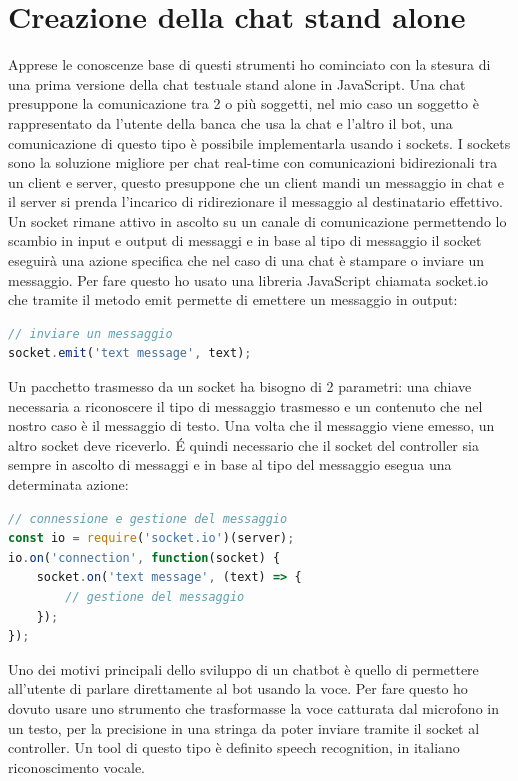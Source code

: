 \section{Creazione della chat stand alone}
Apprese le conoscenze base di questi strumenti ho cominciato con la stesura di una prima versione della chat testuale stand alone in JavaScript. Una chat presuppone la comunicazione tra 2 o più soggetti, nel mio caso un soggetto è rappresentato da l'utente della banca che usa la chat e l'altro il bot, una comunicazione di questo tipo è possibile implementarla usando i sockets.
I sockets sono la soluzione migliore per chat real-time con comunicazioni bidirezionali tra un client e server, questo presuppone che un client mandi un messaggio in chat e il server si prenda l'incarico di ridirezionare il messaggio al destinatario effettivo. Un socket rimane attivo in ascolto su un canale di comunicazione permettendo lo scambio in input e output di messaggi e in base al tipo di messaggio il socket eseguirà una azione specifica che nel caso di una chat è stampare o inviare un messaggio. Per fare questo ho usato una libreria JavaScript chiamata socket.io  che tramite il metodo emit permette di emettere un messaggio in output:
\begin{lstlisting}[language=JavaScript]
// inviare un messaggio
socket.emit('text message', text);
\end{lstlisting}

Un pacchetto trasmesso da un socket ha bisogno di 2 parametri: una chiave necessaria a riconoscere il tipo di messaggio trasmesso e un contenuto che nel nostro caso è il messaggio di testo.
Una volta che il messaggio viene emesso, un altro socket deve riceverlo. \'{E} quindi necessario che il socket del controller sia sempre in ascolto di messaggi e in base al tipo del messaggio esegua una determinata azione:
\begin{lstlisting}[language=JavaScript]
// connessione e gestione del messaggio
const io = require('socket.io')(server);
io.on('connection', function(socket) {
    socket.on('text message', (text) => {
        // gestione del messaggio
    });
});
\end{lstlisting}

Uno dei motivi principali dello sviluppo di un chatbot è quello di permettere all'utente di parlare direttamente al bot usando la voce. Per fare questo ho dovuto usare uno strumento che trasformasse la voce catturata dal microfono in un testo, per la precisione in una stringa da poter inviare tramite il socket al controller. Un tool di questo tipo è definito speech recognition, in italiano riconoscimento vocale.
